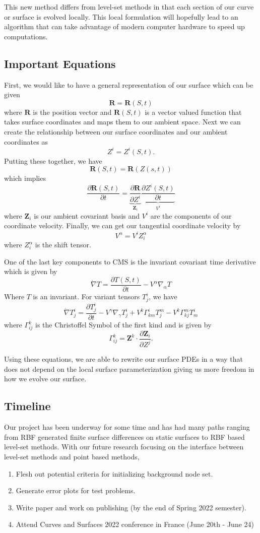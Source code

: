 \documentclass[a4paper,11pt]{article}
\newcommand{\pos}{\mathbf{R}}
\newcommand{\covt}{\dot{\nabla}}
\newcommand{\pd}{\partial}
\begin{document}
	This new method differs from level-set methods in that each section of our curve or surface is evolved locally. This local formulation will hopefully lead to an algorithm that can take advantage of modern computer hardware to speed up computations. 
	
\subsection*{Important Equations}
	First, we would like to have a general representation of our surface which can be given
	\[
		\pos = \pos(S,t)
	\]
	where $ \pos $ is the position vector and $ \pos(S, t) $ is a vector valued function that takes surface coordinates and maps them to our ambient space. Next we can create the relationship between our surface coordinates and our ambient coordinates as
	\[
		Z^i = Z^i(S, t).
	\]
	Putting these together, we have
	\[
		\pos(S, t) = \pos(Z(s,t))
	\]
	which implies
	\[
		\frac{\pd \pos(S, t)}{\pd t} = \underbrace{\frac{\pd \pos}{\pd Z^i}}_{\mathbf{Z}_i} \underbrace{\frac{\pd Z^i(S, t)}{\pd t}}_{V^i}
	\]
	where $ \mathbf{Z}_i $ is our ambient covariant basis and $ V^i $ are the components of our coordinate velocity. Finally, we can get our tangential coordinate velocity by
	\[
		V^\alpha = V^i Z_i^\alpha
	\]
	where $ Z_i^\alpha $ is the shift tensor.
	
	One of the last key components to CMS is the invariant covariant time derivative which is given by
	\[
		\covt T = \frac{\pd T (S, t)}{\pd t} - V^\alpha \nabla_\alpha T
	\]
	Where $ T $ is an invariant. For variant tensors $ T_j^i $, we have
	\[
		\covt T_j^i = \frac{\pd T_j^i}{\pd t} - V^\gamma \nabla_\gamma T_j^i + V^k \Gamma_{km}^i T_j^m - V^k \Gamma_{kj}^m T_m^i
	\]
	where $ \Gamma_{ij}^k $ is the Christoffel Symbol of the first kind and is given by
	\[
		\Gamma_{ij}^k = \mathbf{Z}^k \cdot \frac{\partial \mathbf{Z}_i}{\partial Z^j}.
	\]
	
	Using these equations, we are able to rewrite our surface PDEs in a way that does not depend on the local surface parameterization giving us more freedom in how we evolve our surface.
	
\subsection*{Timeline}
	Our project has been underway for some time and has had many paths ranging from RBF generated finite surface differences on static surfaces to RBF based  level-set methods. With our future research focusing on the interface between level-set methods and point based methods, 
	
	\begin{enumerate}[label = \arabic*), itemsep = 0pt, topsep = 0pt]
		\item Flesh out potential criteria for initializing background node set.
		\item Generate error plots for test problems.
		\item Write paper and work on publishing (by the end of Spring 2022 semester).
		\item Attend Curves and Surfaces 2022 conference in France (June 20th - June 24)
	\end{enumerate}
\end{document}
